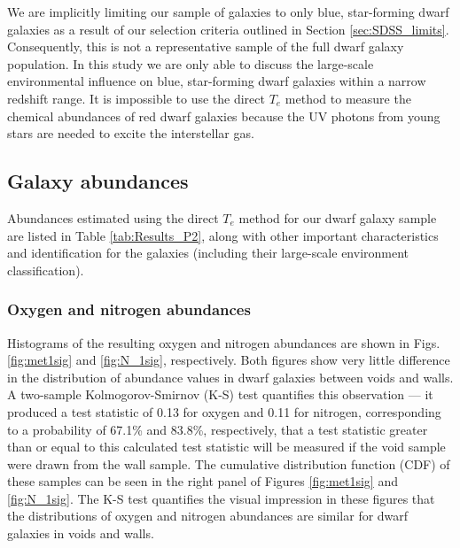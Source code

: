 We are implicitly limiting our sample of galaxies to only blue, star-forming 
dwarf galaxies as a result of our selection criteria outlined in Section 
\ref{sec:SDSS_limits}.  Consequently, this is not a representative sample of the 
full dwarf galaxy population.  In this study we are only able to discuss the 
large-scale environmental influence on blue, star-forming dwarf galaxies within 
a narrow redshift range.  It is impossible to use the direct $T_e$ method to 
measure the chemical abundances of red dwarf galaxies because the UV photons 
from young stars are needed to excite the interstellar gas.


\subsection{Galaxy abundances}

Abundances estimated using the direct $T_e$ method for our dwarf galaxy sample 
are listed in Table \ref{tab:Results_P2}, along with other important 
characteristics and identification for the galaxies (including their large-scale 
environment classification).




\subsubsection{Oxygen and nitrogen abundances}\label{sec:OH_NH}

Histograms of the resulting oxygen and nitrogen abundances are shown in Figs. 
\ref{fig:met1sig} and \ref{fig:N_1sig}, respectively.  Both figures show very 
little difference in the distribution of abundance values in dwarf galaxies 
between voids and walls.  A two-sample Kolmogorov-Smirnov (K-S) test quantifies 
this observation --- it produced a test statistic of 0.13 for oxygen and 0.11 
for nitrogen, corresponding to a probability of 67.1\% and 83.8\%, respectively, 
that a test statistic greater than or equal to this calculated test statistic 
will be measured if the void sample were drawn from the wall sample.  The 
cumulative distribution function (CDF) of these samples can be seen in the right 
panel of Figures \ref{fig:met1sig} and \ref{fig:N_1sig}.  The K-S test 
quantifies the visual impression in these figures that the distributions of 
oxygen and nitrogen abundances are similar for dwarf galaxies in voids and 
walls.

